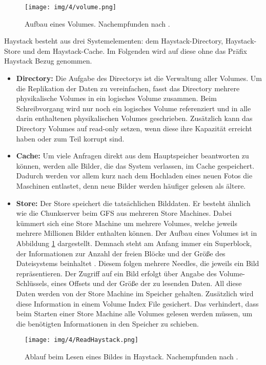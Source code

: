 \documentclass[12pt,oneside,a4paper,parskip]{scrbook}
\begin{document}
\begin{figure}
  \centering
  \texttt{[image: img/4/volume.png]}
  \caption[Aufbau eines Haystack-Volumes]{ Aufbau eines Volumes. Nachempfunden nach \cite{haystack}.}
  \label{volume}
\end{figure}
Haystack besteht aus drei Systemelementen: dem Haystack-Directory, Haystack-Store und dem Haystack-Cache. Im Folgenden wird auf diese ohne das Präfix Haystack Bezug genommen.
\begin{itemize}
  \item \textbf{Directory:} Die Aufgabe des Directorys ist die Verwaltung aller Volumes. Um die Replikation der Daten zu vereinfachen, fasst das Directory mehrere physikalische Volumes in ein logisches Volume zusammen. Beim Schreibvorgang wird nur noch ein logisches Volume referenziert und in alle darin enthaltenen physikalischen Volumes geschrieben. Zusätzlich kann das Directory Volumes auf read-only setzen, wenn diese ihre Kapazität erreicht haben oder zum Teil korrupt sind.
  \item \textbf{Cache:} Um viele Anfragen direkt aus dem Hauptspeicher beantworten zu können, werden alle Bilder, die das System verlassen, im Cache gespeichert. Dadurch werden vor allem kurz nach dem Hochladen eines neuen Fotos die Maschinen entlastet, denn neue Bilder werden häufiger gelesen als ältere.
  \item \textbf{Store:} Der Store speichert die tatsächlichen Bilddaten. Er besteht ähnlich wie die Chunkserver beim GFS aus mehreren Store Machines. Dabei kümmert sich eine Store Machine um mehrere Volumes, welche jeweils mehrere Millionen Bilder enthalten können. Der Aufbau eines Volumes ist in Abbildung \ref{volume} dargestellt. Demnach steht am Anfang immer ein Superblock, der Informationen zur Anzahl der freien Blöcke und der Größe des Dateisystems beinhaltet \cite{wiki:superblock}. Diesem folgen mehrere Needles, die jeweils ein Bild repräsentieren. Der Zugriff auf ein Bild erfolgt über Angabe des Volume-Schlüssels, eines Offsets und der Größe der zu lesenden Daten. All diese Daten werden von der Store Machine im Speicher gehalten. Zusätzlich wird diese Information in einem Volume Index File gesichert. Das verhindert, dass beim Starten einer Store Machine alle Volumes gelesen werden müssen, um die benötigten Informationen in den Speicher zu schieben. 
\end{itemize}

\begin{figure}[h]
  \centering
  \texttt{[image: img/4/ReadHaystack.png]}
  \caption[Ablauf beim Lesen eines Bildes in Haystack.]{ Ablauf beim Lesen eines Bildes in Haystack. Nachempfunden nach \cite{haystack}.}
  \label{readHaystack}
\end{figure}
\end{document}
